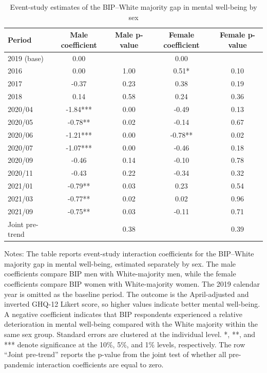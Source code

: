\begin{table}[htbp]
\centering
\caption{Event-study estimates of the BIP--White majority gap in mental well-being by sex}
\label{tab:event_study_bip_bysex}
\small
\begin{tabular}{lcccc}
\toprule
Period & Male coefficient & Male p-value & Female coefficient & Female p-value \\
\midrule
2019 (base) & 0.00 &  & 0.00 &  \\
2016 & 0.00 & 1.00 & 0.51* & 0.10 \\
2017 & -0.37 & 0.23 & 0.38 & 0.19 \\
2018 & 0.14 & 0.58 & 0.24 & 0.36 \\
2020/04 & -1.84*** & 0.00 & -0.49 & 0.13 \\
2020/05 & -0.78** & 0.02 & -0.14 & 0.67 \\
2020/06 & -1.21*** & 0.00 & -0.78** & 0.02 \\
2020/07 & -1.07*** & 0.00 & -0.46 & 0.18 \\
2020/09 & -0.46 & 0.14 & -0.10 & 0.78 \\
2020/11 & -0.43 & 0.22 & -0.34 & 0.32 \\
2021/01 & -0.79** & 0.03 & 0.23 & 0.54 \\
2021/03 & -0.77** & 0.02 & 0.02 & 0.96 \\
2021/09 & -0.75** & 0.03 & -0.11 & 0.71 \\
Joint pre-trend &  & 0.38 &  & 0.39 \\
\bottomrule
\end{tabular}

\begin{flushleft}
\footnotesize
Notes: The table reports event-study interaction coefficients for the BIP--White majority gap in mental well-being, estimated separately by sex. The male coefficients compare BIP men with White-majority men, while the female coefficients compare BIP women with White-majority women. The 2019 calendar year is omitted as the baseline period. The outcome is the April-adjusted and inverted GHQ-12 Likert score, so higher values indicate better mental well-being. A negative coefficient indicates that BIP respondents experienced a relative deterioration in mental well-being compared with the White majority within the same sex group. Standard errors are clustered at the individual level. *, **, and *** denote significance at the 10\%, 5\%, and 1\% levels, respectively. The row ``Joint pre-trend'' reports the p-value from the joint test of whether all pre-pandemic interaction coefficients are equal to zero.
\end{flushleft}
\end{table}